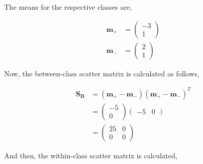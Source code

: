 \documentclass[11pt, a4paper]{article}
\begin{document}
The means for the respective classes are,

\begin{align*}
	\boldsymbol{m_{+}} & = \begin{pmatrix} 
	-3 \\
	1 
	\end{pmatrix} \\
	\boldsymbol{m_{-}} & = \begin{pmatrix} 
	2 \\
	1 
	\end{pmatrix}    
\end{align*}

Now, the between-class scatter matrix is calculated as follows,

\begin{align*}
	\boldsymbol{S_B} & = (\boldsymbol{m_{+}} - \boldsymbol{m_{-}})(\boldsymbol{m_{+}} - \boldsymbol{m_{-}})^T \\ 
	                 & = \begin{pmatrix}                                                                      
	-5 \\
	0 
	\end{pmatrix} \begin{pmatrix}
	-5               & 0                                                                                      
	\end{pmatrix} \\
	                 & = \begin{pmatrix}                                                                      
	25               & 0                                                                                      \\
	0                & 0                                                                                      
	\end{pmatrix}         
\end{align*}

And then, the within-class scatter matrix is calculated,
\end{document}
